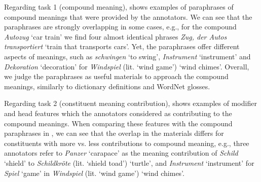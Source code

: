 \documentclass[output=paper,colorlinks,citecolor=brown]{langscibook}
\begin{document}
Regarding task 1 (compound meaning),  shows examples of paraphrases of compound meanings that were provided by the annotators. We can see that the paraphrases are strongly overlapping in some cases, e.g., for the compound \textit{Autozug} `car train' we find four almost identical phrases \textit{Zug, der Autos transportiert} `train that transports cars'. Yet, the paraphrases offer different aspects of meanings, such as \textit{schwingen} `to swing', \textit{Instrument} `instrument' and \textit{Dekoration} `decoration' for \textit{Windspiel} (lit. `wind game') `wind chimes'. Overall, we judge the paraphrases as useful materials to approach the compound meanings, similarly to dictionary definitions and WordNet glosses.\largerpage

Regarding task 2 (constituent meaning contribution),  shows examples of modifier and head features which the annotators considered as contributing to the compound meanings. When comparing these features with the compound paraphrases in , we can see that the overlap in the materials differs for constituents with more vs. less contributions to compound meaning, e.g., three annotators refer to \textit{Panzer} `carapace' as the meaning contribution of \textit{Schild} `shield' to \textit{Schildkröte} (lit. `shield toad') `turtle', and \textit{Instrument} `instrument' for \textit{Spiel} `game' in \textit{Windspiel} (lit. `wind game') `wind chimes'.
\end{document}
